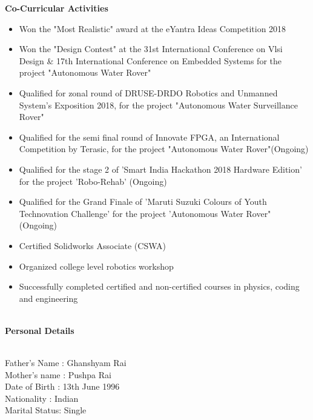 \documentclass[letterpaper,11pt]{article}
\newcommand{\SmallSep}{\vspace{0.5em}}
\newcommand{\CVSection}[1]
{\Large\textbf{#1}\par
	\SmallSep\normalsize\normalfont}
\begin{document}
\CVSection{Co-Curricular Activities}

\begin{itemize}
	\item Won the "Most Realistic" award at the eYantra Ideas Competition 2018 
	\item Won the "Design Contest" at the 31st International Conference on Vlsi Design \& 17th International Conference on Embedded Systems for the project "Autonomous Water Rover"
	\item Qualified for zonal round of DRUSE-DRDO Robotics and Unmanned System's Exposition 2018, for the project "Autonomous Water Surveillance Rover"
	\item Qualified for the semi final round of Innovate FPGA, an International Competition by Terasic, for the project "Autonomous Water Rover"(Ongoing)
	\item Qualified for the stage 2 of 'Smart India Hackathon 2018 Hardware Edition' for the project 'Robo-Rehab' (Ongoing)
	\item Qualified for the Grand Finale of 'Maruti Suzuki Colours of Youth Technovation Challenge' for the project 'Autonomous Water Rover" (Ongoing)
	\item Certified Solidworks Associate (CSWA)
	\item Organized college level robotics workshop
	\item Successfully completed certified and non-certified courses in physics, coding and engineering 
	
\end{itemize} 

\textbf{}  \\

\CVSection{Personal Details}
\textbf{}  \\
Father's Name : Ghanshyam Rai\\
Mother's name : Pushpa Rai\\
Date of Birth\hspace{0.28cm} : 13th June 1996\\
Nationality   \hspace{0.68cm}: Indian \\
Marital Status\hspace{0.25cm}: Single\\
\textbf{}  \\
\textbf{}  \\
\end{document}
